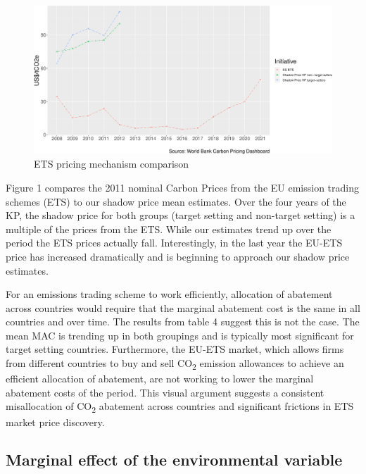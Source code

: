 \documentclass[
  10pt,
]{article}
\begin{document}
\begin{figure}[H]
\includegraphics{figures/paper-ETS comparision-1} \caption{ETS pricing mechanism comparison}\label{fig:ETS comparision}
\end{figure}

Figure 1 compares the 2011 nominal Carbon Prices from the EU emission
trading schemes (ETS) to our shadow price mean estimates. Over the four
years of the KP, the shadow price for both groups (target setting and
non-target setting) is a multiple of the prices from the ETS. While our
estimates trend up over the period the ETS prices actually fall.
Interestingly, in the last year the EU-ETS price has increased
dramatically and is beginning to approach our shadow price estimates.

For an emissions trading scheme to work efficiently, allocation of
abatement across countries would require that the marginal abatement
cost is the same in all countries and over time. The results from table
4 suggest this is not the case. The mean MAC is trending up in both
groupings and is typically most significant for target setting
countries. Furthermore, the EU-ETS market, which allows firms from
different countries to buy and sell CO\textsubscript{2} emission
allowances to achieve an efficient allocation of abatement, are not
working to lower the marginal abatement costs of the period. This visual
argument suggests a consistent misallocation of CO\textsubscript{2}
abatement across countries and significant frictions in ETS market price
discovery.

\hypertarget{marginal-effect-of-the-environmental-variable}{%
\subsection{Marginal effect of the environmental
variable}\label{marginal-effect-of-the-environmental-variable}}
\end{document}
